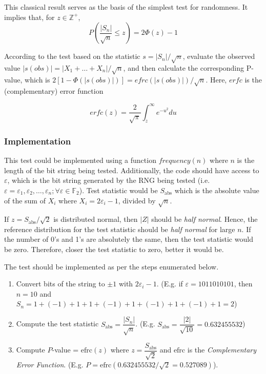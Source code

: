 This classical result serves as the basis of the simplest test for randomness. It implies that, for $z \in \mathbb{Z}^+$,
\[
    P(\dfrac{\lvert S_n \rvert}{\sqrt{n}} \leq z) = 2\Phi(z) - 1
\]

According to the test based on the statistic $s = \lvert S_n \rvert / \sqrt{n}$, evaluate the observed value $\lvert s(obs) \rvert = \lvert X_1 + \ldots + X_n \rvert / \sqrt{n}$, and then calculate the corresponding P-value, which is $2[1 - \Phi(\lvert s(obs) \rvert)] = efrc(\lvert s(obs) \rvert)/\sqrt{n}$. Here, $erfc$ is the (complementary) error function

\[
\textit{erfc}(z) = \dfrac{2}{\sqrt{\pi}}\int_{z}^{\infty}e^{-u^2} du
\]

\subsubsection{Implementation}

This test could be implemented using a function $frequency(n)$ where $n$ is the length of the bit string being tested. Additionally, the code should have access to $\varepsilon$, which is the bit string generated by the RNG being tested (i.e. $\varepsilon = \varepsilon_1, \varepsilon_2, \ldots, \varepsilon_n; \forall \varepsilon \in \mathbb{F}_2$). Test statistic would be $S_{\text{abs}}$ which is the absolute value of the sum of $X_i$ where $X_i = 2\varepsilon_i - 1$, divided by $\sqrt{n}$.

If $z = S_{\text{abs}} / \sqrt{2}$ is distributed normal, then $\lvert Z \rvert$ should be \textit{half normal}. Hence, the reference distribution for the test statistic should be \textit{half normal} for large $n$. If the number of 0's and 1's are absolutely the same, then the test statistic would be zero. Therefore, closer the test statistic to zero, better it would be.

The test should be implemented as per the steps enumerated below.

\begin{enumerate}
    \item Convert bits of the string to $\pm 1$ with $2\varepsilon_i - 1$. (E.g. if $\varepsilon = 1011010101$, then $n=10$ and $S_n = 1 + (-1) + 1 + 1 + (-1) + 1 + (-1) + 1 + (-1) + 1 = 2$)
    
    \item Compute the test statistic $S_{\text{abs}} = \dfrac{\lvert S_n \rvert}{\sqrt{n}}$. (E.g. $S_{\text{abs}} = \dfrac{\lvert 2 \rvert}{\sqrt{10}} = 0.632455532$)
    
    \item Compute $P$-value = $\text{efrc}(z)$ where $z = \dfrac{S_{\text{abs}}}{\sqrt{2}}$ and $\text{efrc}$ is the \textit{Complementary Error Function}. (E.g. $P = \text{efrc}(0.632455532 / \sqrt{2} = 0.527089)$).
\end{enumerate}


